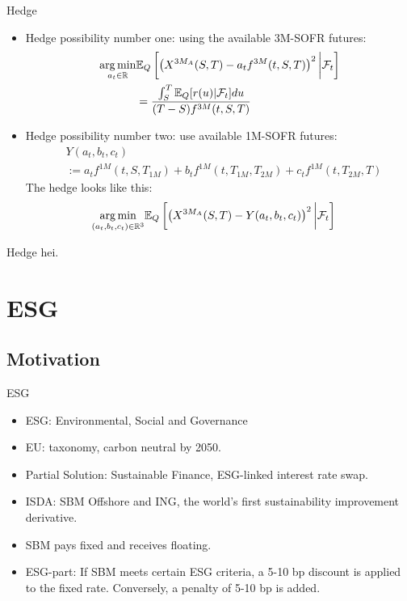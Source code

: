 \documentclass[UKenglish]{beamer}
\newcommand{\E}{\mathbb{E}}  %
\newcommand{\F}{\mathcal{F}} %
\newcommand{\R}{\mathbb{R}} %
\begin{document}
\begin{frame}{Hedge}
\begin{itemize}
    \item Hedge possibility number one: using the available 3M-SOFR futures: 
\begin{align*}
\underset{a_{t}\in \R}{\arg\min}
&\E_{Q}\left[
\left(
X^{3M_{A}}(S,T)-a_{t}f^{3M}(t,S,T)
\right)^{2}
\bigg{|}\F_{t}
\right] \\ 
&= \frac{
\int_{S}^{T}\E_{Q}[r(u)|\F_{t}]du
}{
(T-S)f^{3M}(t,S,T)
}      
\end{align*}
    \item Hedge possibility number two: use available 1M-SOFR futures: 
\begin{align*}
&Y(a_{t}, b_{t}, c_{t}) \\
&:= 
a_{t}f^{1M}(t,S,T_{1M}) + 
b_{t}f^{1M}(t,T_{1M}, T_{2M}) + 
c_{t}f^{1M}(t,T_{2M}, T)
\end{align*}    
The hedge looks like this: 
\begin{align*}
\underset{(a_{t}, b_{t}, c_{t})\in \R^{3}}{\arg\min}
&\E_{Q}\left[
\left(
X^{3M_{A}}(S,T)-Y(a_{t}, b_{t}, c_{t})
\right)^{2}
\bigg{|}\F_{t}
\right]    
\end{align*}

\end{itemize}
\end{frame}

\begin{frame}{Hedge}
 hei.   
\end{frame}

\section{ESG}

\subsection{Motivation}
\begin{frame}{ESG}
\begin{itemize}
    \item ESG: Environmental, Social and Governance
    \item EU: taxonomy, carbon neutral by 2050. 
    \item Partial Solution: Sustainable Finance,
          ESG-linked interest rate swap. 
    \item ISDA: SBM Offshore and ING, the world's first sustainability improvement derivative. 
    \item SBM pays fixed and receives floating. 
    \item ESG-part: If SBM meets certain ESG criteria, a 5-10 bp discount is applied to the fixed rate. Conversely, a penalty of 5-10 bp is added.  
\end{itemize}
\end{frame}
\end{document}
